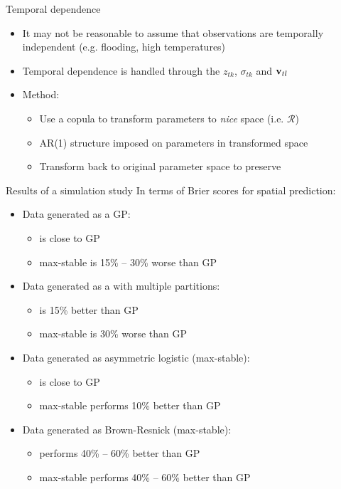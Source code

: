 \documentclass{beamer}
\begin{document}
 \begin{frame}{Temporal dependence}
 	\begin{itemize}\setlength\itemsep{1em}
 	\item It may not be reasonable to assume that observations are temporally independent (e.g. flooding, high temperatures)
 	\item Temporal dependence is handled through the $z_{tk}$, $\sigma_{tk}$ and $\mathbf{v}_{tl}$
 	\item Method: \vspace{0.5em}
 	\begin{itemize}\setlength\itemsep{0.5em}
 	\item Use a copula to transform parameters to \emph{nice} space (i.e. $\mathcal{R}$)
 	\item AR(1) structure imposed on parameters in transformed space
 	\item Transform back to original parameter space to preserve \skewt{}
 	\end{itemize}
 	\end{itemize}
 \end{frame}


\begin{frame}{Results of a simulation study}
In terms of Brier scores for spatial prediction:\vspace{1em}
\begin{itemize}\setlength\itemsep{1em}
	\item Data generated as a GP:
	\begin{itemize}
	 	\item \skewt{} is close to GP
	 	\item max-stable is 15\% -- 30\% worse than GP
	\end{itemize}
	\item Data generated as a \skewt{} with multiple partitions:
	\begin{itemize}
		\item \skewt{} is 15\% better than GP
	 	\item max-stable is 30\% worse than GP
	\end{itemize}
	\item Data generated as asymmetric logistic (max-stable):
	\begin{itemize}
		\item \skewt{} is close to GP
		\item max-stable performs 10\% better than GP
	\end{itemize}
 	\item Data generated as Brown-Resnick (max-stable):
 	\begin{itemize}
		\item \skewt{} performs 40\% -- 60\% better than GP
 		\item max-stable performs 40\% -- 60\% better than GP
 	\end{itemize}
\end{itemize}
\end{frame}
\end{document}
